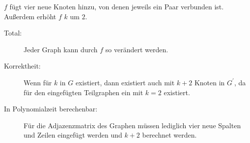 \documentclass{lehramt-informatik-aufgabe}
\begin{document}
\begin{liAntwort}
\liPolynomiellReduzierbar{\vc}{\vcDrei}

\noindent
$f$ fügt vier neue Knoten hinzu, von denen jeweils ein Paar verbunden
ist. Außerdem erhöht $f$ $k$ um $2$.

\begin{description}
\item[Total:]

Jeder Graph kann durch $f$ so verändert werden.

\item[Korrektheit:]

Wenn \vc{} für $k$ in $G$ existiert, dann existiert auch \vc{} mit $k +
2$ Knoten in $G^\prime$, da für den eingefügten Teilgraphen ein \vc{}
mit $k = 2$ existiert.

\item[In Polynomialzeit berechenbar:]

Für die Adjazenzmatrix des Graphen müssen lediglich vier neue Spalten
und Zeilen eingefügt werden und $k + 2$ berechnet werden.
\end{description}

\end{liAntwort}
\end{document}
